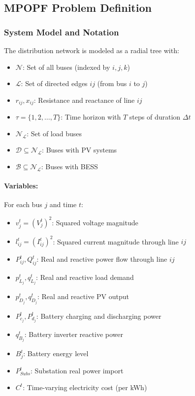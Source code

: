 \subsection{MPOPF Problem Definition}

\subsubsection{System Model and Notation}

The distribution network is modeled as a radial tree with:
\begin{itemize}
    \item $\mathcal{N}$: Set of all buses (indexed by $i, j, k$)
    \item $\mathcal{L}$: Set of directed edges $ij$ (from bus $i$ to $j$)
    \item $r_{ij}, x_{ij}$: Resistance and reactance of line $ij$
    \item $\tau = \{1, 2, \ldots, T\}$: Time horizon with $T$ steps of duration $\Delta t$
    \item $\mathcal{N_L}$: Set of load buses
    \item $\mathcal{D} \subseteq \mathcal{N_L}$: Buses with PV systems
    \item $\mathcal{B} \subseteq \mathcal{N_L}$: Buses with BESS
\end{itemize}

\paragraph{Variables:} For each bus $j$ and time $t$:
\begin{itemize}
    \item $v_j^t = (V_j^t)^2$: Squared voltage magnitude
    \item $l_{ij}^t = (I_{ij}^t)^2$: Squared current magnitude through line $ij$
    \item $P_{ij}^t, Q_{ij}^t$: Real and reactive power flow through line $ij$
    \item $p^t_{L_j}, q^t_{L_j}$: Real and reactive load demand
    \item $p^t_{D_j}, q^t_{D_j}$: Real and reactive PV output
    \item $P_{c_j}^t, P_{d_j}^t$: Battery charging and discharging power
    \item $q_{B_j}^t$: Battery inverter reactive power
    \item $B_j^t$: Battery energy level
    \item $P^t_{Subs}$: Substation real power import
    \item $C^t$: Time-varying electricity cost (per kWh)
\end{itemize}

